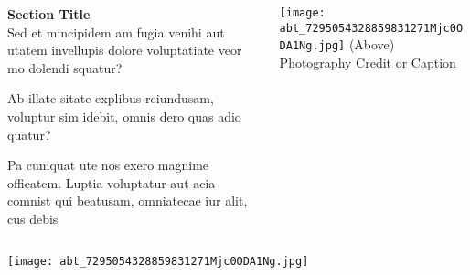 \documentclass[
aspectratio=169, %
t, %
onlytextwidth, %
10pt, %
]{beamer}
\begin{document}

\begin{frame}
    \begin{columns}[T] %
        \begin{column}{0.48\linewidth} %
            \textbf{Section Title}\\
            Sed et mincipidem am fugia venihi aut utatem invellupis dolore voluptatiate veor mo dolendi squatur?

            Ab illate sitate explibus reiundusam, voluptur sim idebit, omnis dero quas adio quatur?

            Pa cumquat ute nos exero magnime officatem. Luptia voluptatur aut acia comnist qui beatusam, omniatecae iur alit, cus debis
        \end{column}
        \begin{column}{0.48\linewidth} %
            \texttt{[image: abt\_7295054328859831271Mjc0ODA1Ng.jpg]} %
            {\tiny\textcolor{ICLBlue}{(Above) Photography Credit or Caption}}
        \end{column}
    \end{columns}
\end{frame}


\begin{frame}
    \texttt{[image: abt\_7295054328859831271Mjc0ODA1Ng.jpg]} %
\end{frame}


\begingroup
{} %

\begin{frame}[plain] %
\end{frame}
\endgroup
\end{document}
